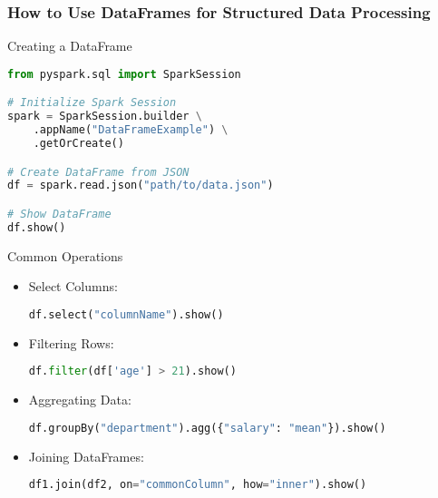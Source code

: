 \documentclass[aspectratio=169]{beamer}
\begin{document}
\begin{frame}[fragile]
    \frametitle{How to Use DataFrames for Structured Data Processing}
    \begin{block}{Creating a DataFrame}
        \begin{lstlisting}[language=Python]
from pyspark.sql import SparkSession

# Initialize Spark Session
spark = SparkSession.builder \
    .appName("DataFrameExample") \
    .getOrCreate()

# Create DataFrame from JSON
df = spark.read.json("path/to/data.json")

# Show DataFrame
df.show()
        \end{lstlisting}
    \end{block}
    
    \begin{block}{Common Operations}
        \begin{itemize}
            \item Select Columns:
            \begin{lstlisting}[language=Python]
df.select("columnName").show()
            \end{lstlisting}
            \item Filtering Rows:
            \begin{lstlisting}[language=Python]
df.filter(df['age'] > 21).show()
            \end{lstlisting}
            \item Aggregating Data:
            \begin{lstlisting}[language=Python]
df.groupBy("department").agg({"salary": "mean"}).show()
            \end{lstlisting}
            \item Joining DataFrames:
            \begin{lstlisting}[language=Python]
df1.join(df2, on="commonColumn", how="inner").show()
            \end{lstlisting}
        \end{itemize}
    \end{block}
\end{frame}
\end{document}
